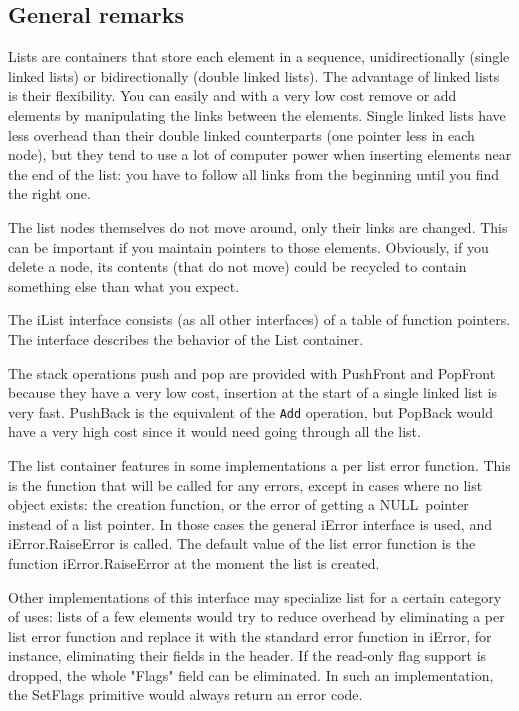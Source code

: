 \documentclass[12pt,a4paper]{memoir} %
\newif\iftth
\newcommand{\Null}{{\iftth \ NULL \else \footnotesize NULL\  \fi}}
\newlength{\drop}
\begin{document}


\subsection{General remarks}
Lists are containers that store each element in a sequence, unidirectionally (single linked lists) or bidirectionally (double linked lists).
The advantage of linked lists is their flexibility. You can easily and with a very low cost remove or add elements by manipulating the links between the elements. Single linked lists have less overhead than their double linked counterparts (one pointer less in each node), but they tend to use a lot of computer power when inserting elements near the end of the list: you have to follow all links from the beginning until you find the right one.

The list nodes themselves do not move around, only their links are changed. This can be important if you maintain pointers to those elements. Obviously, if you delete a node, its contents (that do not move) could be recycled to contain something else than what you expect.

The iList interface consists (as all other interfaces) of a table of function pointers. The interface describes the behavior of the List container.

The stack operations push and pop are provided with PushFront and PopFront because they have a very low cost, insertion at the start of a single linked list is very fast. PushBack is the equivalent of the \verb,Add, operation, but PopBack would have a very high cost since it would need going through all the list. 

The list container features in some implementations a per list error function.  This is the function that will be called for any errors, except in  
cases where no list object exists: the creation function, or the error of getting a \Null pointer instead of a list pointer. In those cases the general 
iError interface is used, and iError.RaiseError is called. The default value of the list error function is the function iError.RaiseError at the moment 
the list is created.

Other implementations of this interface may specialize list for a certain category of uses: lists of a few elements would try to reduce overhead by 
eliminating a per list error function and replace it with the standard error function in iError, for instance, eliminating their fields in the header. 
If the read-only flag support is dropped, the whole "Flags" field can be eliminated. In such an implementation, the SetFlags primitive would always 
return an error code.
\end{document}
